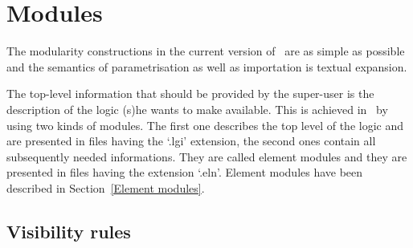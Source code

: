 
\FEX

\section{Modules}
\label{Modularity}

The modularity constructions in the current version of \elan\ are as
simple as possible and the semantics of parametrisation as well as
importation is textual expansion.


The top-level information that should be provided by the super-user
is the description of the logic (s)he wants to make available. This is
achieved in \elan\ by using two kinds of modules. The first one
describes the top level of the logic and are presented in files having
the `.lgi' extension, the second ones contain all subsequently
needed informations.  They are called element modules and they are
presented in files having the extension `.eln'. Element modules have been
described in Section~\ref{Element modules}.

\subsection{Visibility rules}

